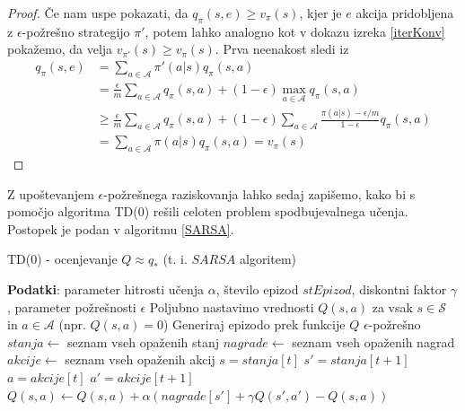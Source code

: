\documentclass[12pt,a4paper]{amsart}
\theoremstyle{definition} %
\theoremstyle{plain} %
\begin{document}
\begin{proof}
    Če nam uspe pokazati, da $q_\pi(s, e) \geq v_\pi(s)$, kjer je $e$ akcija pridobljena 
    z $\epsilon$-požrešno strategijo $\pi'$, potem lahko analogno kot v dokazu izreka 
    \ref{iterKonv} pokažemo, da velja $v_{\pi'}(s) \geq v_\pi(s)$. Prva neenakost sledi iz
    \begin{align*}
        q_\pi(s, e) &= \sum_{a \in \mathcal{A}} \pi'(a|s) q_\pi(s, a) \\
        &= \frac{\epsilon}{m} \sum_{a \in \mathcal{A}} q_\pi(s, a) + (1 - \epsilon) \max_{a \in 
            \mathcal{A}} q_\pi(s, a) \\
        &\geq \frac{\epsilon}{m} \sum_{a \in \mathcal{A}} q_\pi(s, a) + (1 - \epsilon) \sum_{a \in \mathcal{A}} 
            \frac{\pi(a|s) - \epsilon / m}{1 - \epsilon} q_\pi(s, a) \\
        &= \sum_{a \in \mathcal{A}} \pi(a|s) q_\pi(s, a) = v_\pi(s)
    \end{align*}
\end{proof}

Z upoštevanjem $\epsilon$-požrešnega raziskovanja lahko sedaj zapišemo, kako bi s pomočjo algoritma 
TD($0$) rešili celoten problem spodbujevalnega učenja. Postopek je podan v algoritmu \ref{SARSA}.

\begin{algorithm}[H]
    \caption{TD($0$) - ocenjevanje  $Q \approx q_*$ (t. i. $SARSA$ algoritem)}
\begin{algorithmic}\label{SARSA}
    
    \STATE \textbf{Podatki}: parameter hitrosti učenja $\alpha$, število epizod $stEpizod$, diskontni 
            faktor $\gamma$, parameter požrešnosti $\epsilon$
    \STATE 
    \STATE Poljubno nastavimo vrednosti $Q(s, a)$ za vsak $s \in \mathcal{S}$ in $a \in \mathcal{A}$ 
            (npr. $Q(s, a) = 0$)
    \STATE
        \STATE Generiraj epizodo prek funkcije $Q$ $\epsilon$-požrešno
        \STATE $stanja \leftarrow$ seznam vseh opaženih stanj
        \STATE $nagrade \leftarrow$ seznam vseh opaženih nagrad
        \STATE $akcije \leftarrow$ seznam vseh opaženih akcij
        \STATE
        \STATE $s = stanja[t]$
        \STATE $s' = stanja[t + 1]$
        \STATE $a = akcije[t]$
        \STATE $a' = akcije[t + 1]$
        \STATE $Q(s, a) \leftarrow Q(s, a) + \alpha (nagrade[s'] + \gamma Q(s', a') - Q(s, a))$ 
        \ENDFOR
    \ENDFOR

\end{algorithmic}
\end{algorithm}
\end{document}
